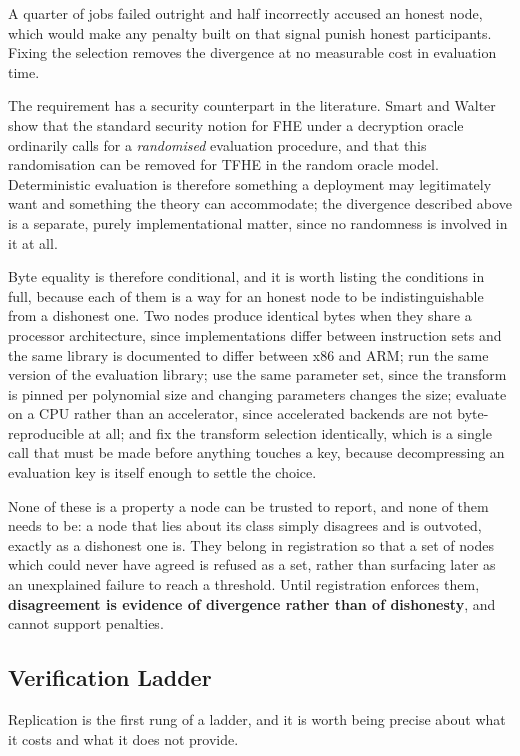 \documentclass[12pt,a4paper]{article}
\begin{document}
A quarter of jobs failed outright and half incorrectly accused an honest node, which would make any penalty built on that signal punish honest participants.
Fixing the selection removes the divergence at no measurable cost in evaluation time.

The requirement has a security counterpart in the literature.
Smart and Walter~\cite{deterministic_tfhe} show that the standard security notion for FHE under a decryption oracle ordinarily calls for a \emph{randomised} evaluation procedure, and that this randomisation can be removed for TFHE in the random oracle model.
Deterministic evaluation is therefore something a deployment may legitimately want and something the theory can accommodate; the divergence described above is a separate, purely implementational matter, since no randomness is involved in it at all.

Byte equality is therefore conditional, and it is worth listing the conditions in full, because each of them is a way for an honest node to be indistinguishable from a dishonest one.
Two nodes produce identical bytes when they share a processor architecture, since implementations differ between instruction sets and the same library is documented to differ between x86 and ARM; run the same version of the evaluation library; use the same parameter set, since the transform is pinned per polynomial size and changing parameters changes the size; evaluate on a CPU rather than an accelerator, since accelerated backends are not byte-reproducible at all; and fix the transform selection identically, which is a single call that must be made before anything touches a key, because decompressing an evaluation key is itself enough to settle the choice.

None of these is a property a node can be trusted to report, and none of them needs to be: a node that lies about its class simply disagrees and is outvoted, exactly as a dishonest one is.
They belong in registration so that a set of nodes which could never have agreed is refused as a set, rather than surfacing later as an unexplained failure to reach a threshold.
Until registration enforces them, \textbf{disagreement is evidence of divergence rather than of dishonesty}, and cannot support penalties.

\subsection{Verification Ladder}

Replication is the first rung of a ladder, and it is worth being precise about what it costs and what it does not provide.
\end{document}
